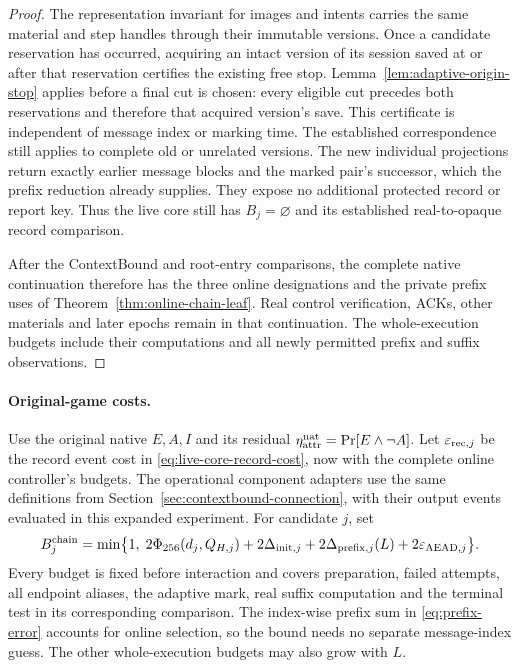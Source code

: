 \documentclass[pdflatex]{sn-jnl}
\theoremstyle{thmstyleone}
\theoremstyle{thmstylethree}
\theoremstyle{thmstyletwo}
\begin{document}
\begin{proof}
The representation invariant for images and intents carries the same
material and step handles through their immutable versions. Once a candidate
reservation has occurred, acquiring an intact version of its session
saved at or after that reservation certifies the existing free stop.
Lemma~\ref{lem:adaptive-origin-stop} applies before a final cut is chosen:
every eligible cut precedes both reservations and therefore that
acquired version's save. This certificate is independent of message
index or marking time. The established correspondence still applies to
complete old or unrelated versions. The new individual projections
return exactly earlier message blocks and the marked pair's successor,
which the prefix reduction already supplies. They expose no additional
protected record or report key. Thus the live core still has
$B_j=\varnothing$ and its established real-to-opaque record comparison.

After the ContextBound and root-entry comparisons, the complete native
continuation therefore has the three online designations and the
private prefix uses of Theorem~\ref{thm:online-chain-leaf}. Real control
verification, ACKs, other materials and later epochs remain in that
continuation. The whole-execution budgets include their computations
and all newly permitted prefix and suffix observations.
\end{proof}

\paragraph{Original-game costs.}
Use the original native $E,A,I$ and its residual
$\eta_{\rm attr}^{\rm nat}=\Pr[E\wedge\neg A]$. Let
$\varepsilon_{{\rm rec},j}$ be the record event cost in
\eqref{eq:live-core-record-cost}, now with the complete online controller's
budgets. The operational component adapters use the same definitions
from Section~\ref{sec:contextbound-connection}, with their output events
evaluated in this expanded experiment. For candidate $j$, set
\begin{equation}
 B_j^{\rm chain}=\min\bigl\{1,\;
  2\Phi_{256}(d_j,Q_{H,j})+2\Delta_{{\rm init},j}
  +2\Delta_{{\rm prefix},j}(L)+2\varepsilon_{{\rm AEAD},j}\bigr\}.
 \label{eq:native-chain-continuation}
\end{equation}
Every budget is fixed before interaction and covers preparation,
failed attempts, all endpoint aliases, the adaptive mark, real suffix
computation and the terminal test in its corresponding comparison.
The index-wise prefix sum in \eqref{eq:prefix-error} accounts for online
selection, so the bound needs no separate message-index guess. The other
whole-execution budgets may also grow with $L$.
\end{document}

